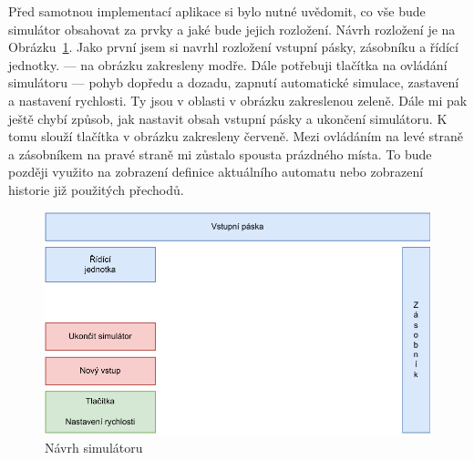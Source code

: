 Před samotnou implementací aplikace si bylo nutné uvědomit, co vše bude simulátor obsahovat za prvky a jaké bude jejich rozložení. Návrh rozložení je na Obrázku~\ref{fig:SimulatorPageDesign}. Jako první jsem si navrhl rozložení vstupní pásky, zásobníku a řídící jednotky. --- na obrázku zakresleny modře. Dále potřebuji tlačítka na ovládání simulátoru --- pohyb dopředu a dozadu, zapnutí automatické simulace, zastavení a nastavení rychlosti. Ty jsou v oblasti v obrázku zakreslenou zeleně. Dále mi pak ještě chybí způsob, jak nastavit obsah vstupní pásky a ukončení simulátoru. K tomu slouží tlačítka v obrázku zakresleny červeně. Mezi ovládáním na levé straně a zásobníkem na pravé straně mi zůstalo spousta prázdného místa. To bude později využito na zobrazení definice aktuálního automatu nebo zobrazení historie již použitých přechodů.

\begin{figure}[h]
    \centering
    \includegraphics{Figures/SimulatoPageDesign.drawio.pdf}
    \caption{Návrh simulátoru}\label{fig:SimulatorPageDesign}
\end{figure}

\endinput